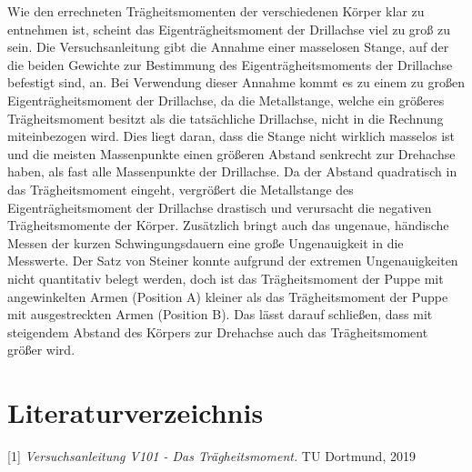 \documentclass[titlepage = firstcover]{scrartcl}
\begin{document}
      Wie den errechneten Trägheitsmomenten der verschiedenen Körper klar zu entnehmen ist, scheint das Eigenträgheitsmoment der Drillachse viel zu groß zu sein.
      Die Versuchsanleitung gibt die Annahme einer masselosen Stange, auf der die beiden Gewichte zur Bestimmung des Eigenträgheitsmoments der Drillachse befestigt sind, an.
      Bei Verwendung dieser Annahme kommt es zu einem zu großen Eigenträgheitsmoment der Drillachse, da die Metallstange, welche ein größeres Trägheitsmoment besitzt als die tatsächliche Drillachse, nicht in die Rechnung miteinbezogen wird.
      Dies liegt daran, dass die Stange nicht wirklich masselos ist und die meisten Massenpunkte einen größeren Abstand senkrecht zur Drehachse haben, als fast alle Massenpunkte der Drillachse.
      Da der Abstand quadratisch in das Trägheitsmoment eingeht, vergrößert die Metallstange des Eigenträgheitsmoment der Drillachse drastisch und verursacht die negativen Trägheitsmomente der Körper.
      Zusätzlich bringt auch das ungenaue, händische Messen der kurzen Schwingungsdauern eine große Ungenauigkeit in die Messwerte.
      Der Satz von Steiner konnte aufgrund der extremen Ungenauigkeiten nicht quantitativ belegt werden, doch ist das Trägheitsmoment der Puppe mit angewinkelten Armen (Position A)
      kleiner als das Trägheitsmoment der Puppe mit ausgestreckten Armen (Position B). Das lässt darauf schließen, dass mit steigendem Abstand des Körpers zur Drehachse auch das Trägheitsmoment größer wird. \newpage

    \section{Literaturverzeichnis}
      [1] \textit{Versuchsanleitung V101 - Das Trägheitsmoment.} TU Dortmund, 2019
\end{document}
